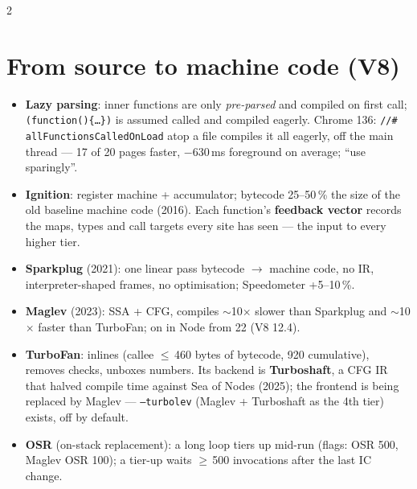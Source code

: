 \documentclass[8pt]{extarticle}
\newcommand\ct[1]{\texttt{#1}}
\begin{document}
\begin{multicols}{2}
\raggedright
\footnotesize{}

\section{From source to machine code (V8)}
\begin{itemize}
  \item \textbf{Lazy parsing}: inner functions are only \emph{pre-parsed} and compiled on first
        call; \ct{(function()\{…\})} is assumed called and compiled eagerly. Chrome 136:
        \ct{//\# allFunctionsCalledOnLoad} atop a file compiles it all eagerly, off the main
        thread — 17 of 20 pages faster, $-$630\,ms foreground on average; ``use sparingly''.
  \item \textbf{Ignition}: register machine + accumulator; bytecode 25–50\,\% the size of the
        old baseline machine code (2016). Each function's \textbf{feedback vector} records the
        maps, types and call targets every site has seen — the input to every higher tier.
  \item \textbf{Sparkplug} (2021): one linear pass bytecode $\to$ machine code, no IR,
        interpreter-shaped frames, no optimisation; Speedometer +5–10\,\%.
  \item \textbf{Maglev} (2023): SSA + CFG, compiles $\sim$10$\times$ slower than Sparkplug and
        $\sim$10$\times$ faster than TurboFan; on in Node from 22 (V8 12.4).
  \item \textbf{TurboFan}: inlines (callee $\le$\,460 bytes of bytecode, 920 cumulative),
        removes checks, unboxes numbers. Its backend is \textbf{Turboshaft}, a CFG IR that halved
        compile time against Sea of Nodes (2025); the frontend is being replaced by Maglev —
        \ct{--turbolev} (Maglev + Turboshaft as the 4th tier) exists, off by default.
  \item \textbf{OSR} (on-stack replacement): a long loop tiers up mid-run (flags: OSR 500,
        Maglev OSR 100); a tier-up waits $\ge$\,500 invocations after the last IC change.
\end{itemize}


\end{multicols}
\end{document}
